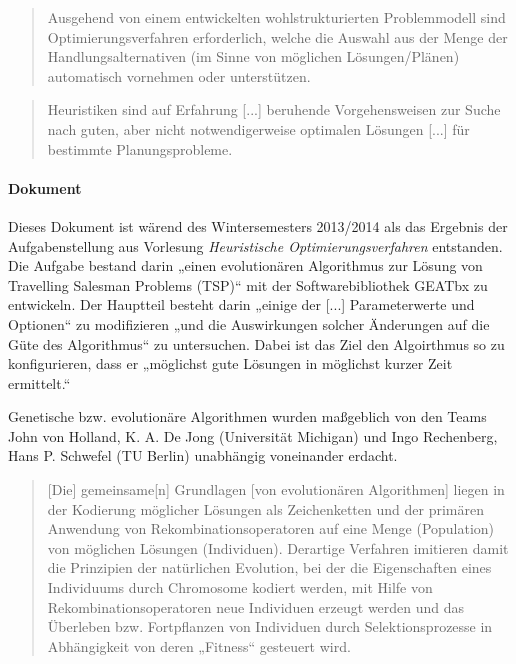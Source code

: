 \begin{quote}
Ausgehend von einem entwickelten wohlstrukturierten Problemmodell sind 
Optimierungsverfahren erforderlich, welche die Auswahl aus der Menge der 
Handlungsalternativen (im Sinne von möglichen Lösungen/Plänen) automatisch
vornehmen oder unterstützen. \citep[S.~3]{fink}
\end{quote}

\begin{quote}
Heuristiken sind auf Erfahrung [...] beruhende Vorgehensweisen zur
Suche nach guten, aber nicht notwendigerweise optimalen Lösungen
[...] für bestimmte Planungsprobleme. \citep[S.~4]{fink}
\end{quote}

\paragraph{Dokument} Dieses Dokument
ist wärend des Wintersemesters 2013/2014 als das
Ergebnis der Aufgabenstellung aus Vorlesung
\emph{Heuristische Optimierungsverfahren} entstanden.
Die Aufgabe bestand darin „einen evolutionären Algorithmus zur Lösung von
Travelling Salesman Problems (TSP)“ mit der Softwarebibliothek GEATbx zu entwickeln.
Der Hauptteil besteht darin „einige der [...] Parameterwerte und Optionen“ zu
modifizieren „und die Auswirkungen solcher Änderungen auf die Güte des Algorithmus“
zu untersuchen.
Dabei ist das Ziel den Algoirthmus so zu konfigurieren, dass er
„möglichst gute Lösungen in möglichst kurzer Zeit ermittelt.“ \citep[Aus][]{aufg}

Genetische bzw. evolutionäre Algorithmen wurden maßgeblich von den Teams
John von Holland, K. A. De Jong (Universität Michigan) und
Ingo Rechenberg, Hans P. Schwefel (TU Berlin) unabhängig voneinander erdacht.
\citep[Vgl.][]{erben}

\begin{quote}
[Die] gemeinsame[n] Grundlagen [von evolutionären Algorithmen] liegen in der
Kodierung möglicher Lösungen als Zeichenketten und der primären Anwendung von
Rekombinationsoperatoren auf eine Menge (Population) von möglichen Lösungen
(Individuen). Derartige Verfahren imitieren damit die Prinzipien der
natürlichen Evolution, bei der die Eigenschaften eines Individuums durch
Chromosome kodiert werden, mit Hilfe von Rekombinationsoperatoren neue
Individuen erzeugt werden und das Überleben bzw. Fortpflanzen von Individuen
durch Selektionsprozesse in Abhängigkeit von deren
„Fitness“ gesteuert wird. \citep[S.~6]{fink}
\end{quote}

